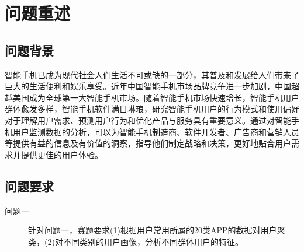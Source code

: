 \documentclass[withoutpreface,bwprint]{cumcmthesis}
\begin{document}
\begin{abstract}
\begin{mdframed}
\begin{enumerate}
        \end{enumerate}

    \end{mdframed}

    \url{https://www.latexstudio.net} 陆续推出了更优质的资源，欢迎学习 。

    欢迎大家到QQ群里沟通交流：91940767/478023327/640633524。我们也开通了问答区交流 \LaTeX{}技术：\url{https://ask.latexstudio.net}，欢迎大家前来交流，有问题就来这里，与大神零距离。

    ：

    \centerline{\texttt{[image: gongzhonghao2]}}

\end{abstract}

\tableofcontents
\newpage

\pagestyle{mainmatterstyle}
\setcounter{page}{1}
\section{问题重述}

\subsection{问题背景}

智能手机已成为现代社会人们生活不可或缺的一部分，其普及和发展给人们带来了巨大的生活便利和娱乐享受。近年中国智能手机市场品牌竞争进一步加剧，中国超越美国成为全球第一大智能手机市场。随着智能手机市场快速增长，智能手机用户群体愈发多样，智能手机软件满目琳琅，研究智能手机用户的行为模式和使用偏好对于理解用户需求、预测用户行为和优化产品与服务具有重要意义。通过对智能手机用户监测数据的分析，可以为智能手机制造商、软件开发者、广告商和营销人员等提供有益的信息及有价值的洞察，指导他们制定战略和决策，更好地贴合用户需求并提供更佳的用户体验。

\subsection{问题要求}

\begin{description}
    \item[问题一] 针对问题一，赛题要求(1)根据用户常用所属的20类APP的数据对用户聚类，(2)对不同类别的用户画像，分析不同群体用户的特征。
    \item[]
\end{description}
\end{document}
